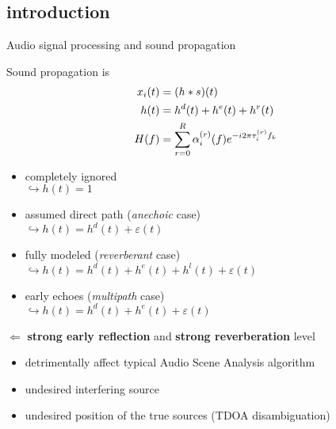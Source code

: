 \subsection{introduction}

\begin{frame}{Audio signal processing and sound propagation}
    \begin{block}{Sound propagation is \cite{chen}}
        \begin{equation*}
            \begin{aligned}
                x_i(t) &= (h \ast s)(t)
                \\ h( t) &= h^d(t) + h^e(t) + h^r(t)
                \\ H( f) &= \sum_{r=0}^{R} \alpha_i^{(r)}(f) {e}^{- {i} 2 \pi \tau_i^{(r)} f_k}
            \end{aligned}
        \end{equation*}
        \begin{itemize}
            \item completely ignored
            \\\hspace{0.5em}$\hookrightarrow  h( t) = 1$
            \item assumed direct path (\textit{anechoic} case)
            \\\hspace{0.5em}$\hookrightarrow  h( t) = h^d(t) + \varepsilon(t)$
            \item fully modeled (\textit{reverberant} case)
            \\\hspace{0.5em}$\hookrightarrow  h( t) = h^d(t) + h^e(t) + h^l(t)+ \varepsilon(t)$
            \item early echoes (\textit{multipath} case)
            \\\hspace{0.5em}$\hookrightarrow  h( t) = h^d(t) + h^e(t) + \varepsilon(t)$
        \end{itemize}
    \end{block}

    \begin{alertblock}{$\Leftarrow$ \textbf{strong early reflection} and \textbf{strong reverberation} level}
        \begin{itemize}
            \item detrimentally affect typical Audio Scene Analysis algorithm
            \item undesired interfering source
            \item undesired position of the true sources (TDOA disambiguation)
        \end{itemize}

    \end{alertblock}
\end{frame}

